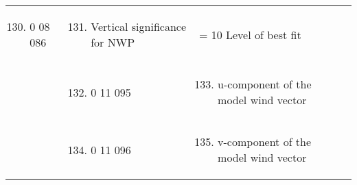 \begin{longtable}[]{@{}llll@{}}
\begin{minipage}[t]{0.22\columnwidth}
\begin{enumerate}
\setcounter{enumi}{129}
\item
  0 08 086
\end{enumerate}\strut
\end{minipage} & \begin{minipage}[t]{0.22\columnwidth}\raggedright
\begin{enumerate}
\setcounter{enumi}{130}
\item
  Vertical significance for NWP
\end{enumerate}\strut
\end{minipage} & \begin{minipage}[t]{0.22\columnwidth}\raggedright
= 10 Level of best fit\strut
\end{minipage}\tabularnewline
\begin{minipage}[t]{0.22\columnwidth}\raggedright
\strut
\end{minipage} & \begin{minipage}[t]{0.22\columnwidth}\raggedright
\begin{enumerate}
\setcounter{enumi}{131}
\item
  0 11 095
\end{enumerate}\strut
\end{minipage} & \begin{minipage}[t]{0.22\columnwidth}\raggedright
\begin{enumerate}
\setcounter{enumi}{132}
\item
  u-component of the model wind vector
\end{enumerate}\strut
\end{minipage} & \begin{minipage}[t]{0.22\columnwidth}\raggedright
\strut
\end{minipage}\tabularnewline
\begin{minipage}[t]{0.22\columnwidth}\raggedright
\strut
\end{minipage} & \begin{minipage}[t]{0.22\columnwidth}\raggedright
\begin{enumerate}
\setcounter{enumi}{133}
\item
  0 11 096
\end{enumerate}\strut
\end{minipage} & \begin{minipage}[t]{0.22\columnwidth}\raggedright
\begin{enumerate}
\setcounter{enumi}{134}
\item
  v-component of the model wind vector

\end{enumerate}
\end{minipage}
\end{longtable}
